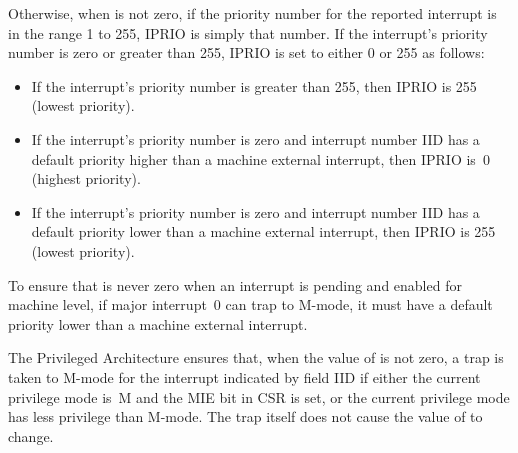 Otherwise, when  is not zero, if the priority number for the reported
interrupt is in the range 1 to 255, IPRIO is simply that number.
If the interrupt's priority number is zero or greater than 255,
IPRIO is set to either 0 or 255 as follows:
\begin{itemize}

\item
If the interrupt's priority number is greater than 255, then
IPRIO is 255 (lowest priority).

\item
If the interrupt's priority number is zero and interrupt number IID has
a default priority higher than a machine external interrupt, then IPRIO
is~0 (highest priority).

\item
If the interrupt's priority number is zero and interrupt number IID has
a default priority lower than a machine external interrupt, then IPRIO
is 255 (lowest priority).

\end{itemize}

\begin{commentary}
To ensure that  is never zero when an interrupt is pending
and enabled for machine level, if major interrupt~0 can trap to
\hbox{M-mode}, it must have a default priority lower than a machine
external interrupt.
\end{commentary}

The {\RISCV} Privileged Architecture ensures that, when the value
of  is not zero, a trap is taken to \mbox{M-mode} for the
interrupt indicated by field IID if either the current privilege
mode is~M and the MIE bit in CSR  is set, or the current
privilege mode has less privilege than \mbox{M-mode}.
The trap itself does not cause the value of  to change.

